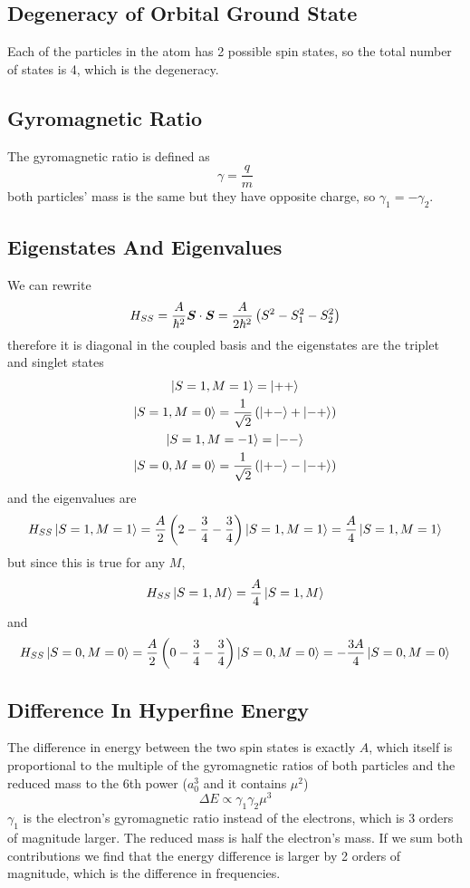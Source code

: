 \subsection{Degeneracy of Orbital Ground State}
Each of the particles in the atom has 2 possible spin states, so the total number of states is 4, which is the degeneracy.
\subsection{Gyromagnetic Ratio}
The gyromagnetic ratio is defined as 
\begin{equation}
    \gamma = \frac{q}{m}
\end{equation}
both particles' mass is the same but they have opposite charge, so \(\gamma_1 = -\gamma_2\).
\subsection{Eigenstates And Eigenvalues}
We can rewrite
\begin{equation}
    H_{SS} = \frac{A}{\hbar^2}\bm{S}\cdot\bm{S} = \frac{A}{2\hbar^2}\left(S^2-S_1^2-S_2^2\right)
\end{equation}
therefore it is diagonal in the coupled basis and the eigenstates are the triplet and singlet states
\begin{gather}
    \ket{S=1, M=1} = \ket{++} \\
    \ket{S=1, M=0} = \frac{1}{\sqrt{2}}\left(\ket{+-}+\ket{-+}\right) \\
    \ket{S=1, M=-1} = \ket{--} \\
    \ket{S=0, M=0} = \frac{1}{\sqrt{2}}\left(\ket{+-}-\ket{-+}\right)
\end{gather}
and the eigenvalues are
\begin{gather}
    H_{SS}\ket{S=1, M=1} = \frac{A}{2}\left(2-\frac{3}{4}-\frac{3}{4}\right)\ket{S=1, M=1} = \frac{A}{4}\ket{S=1, M=1}
\end{gather}
but since this is true for any \(M\),
\begin{gather}
    H_{SS}\ket{S=1, M} = \frac{A}{4}\ket{S=1, M}
\end{gather}
and
\begin{equation}
    H_{SS}\ket{S=0, M=0} = \frac{A}{2}\left(0-\frac{3}{4}-\frac{3}{4}\right)\ket{S=0, M=0}  = -\frac{3A}{4}\ket{S=0, M=0} 
\end{equation}
\subsection{Difference In Hyperfine Energy}
The difference in energy between the two spin states is exactly \(A\), which itself is proportional to the multiple of the gyromagnetic ratios of both particles and the reduced mass to the 6th power (\(a_0^3\) and it contains \(\mu^2\)) 
\begin{equation}
    \Delta E \propto \gamma_1 \gamma_2 \mu^3
\end{equation}
\(\gamma_1\) is the electron's gyromagnetic ratio instead of the electrons, which is 3 orders of magnitude larger. The reduced mass is half the electron's mass. If we sum both contributions we find that the energy difference is larger by 2 orders of magnitude, which is the difference in frequencies.
